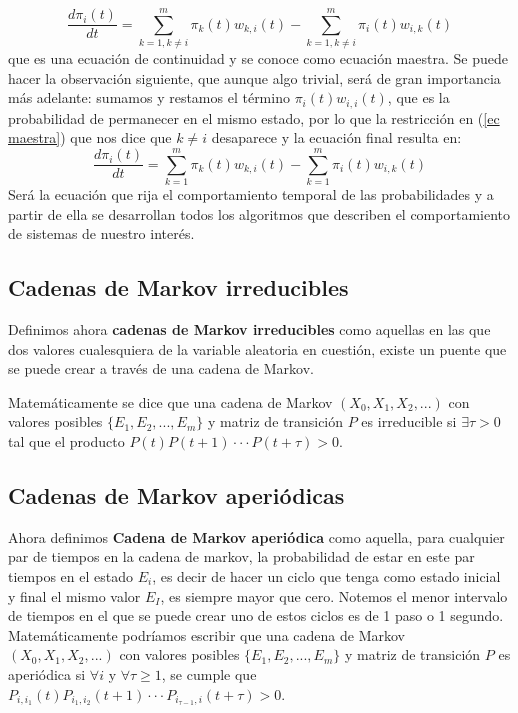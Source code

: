\documentclass[12pt]{book}
\begin{document}
\begin{equation}
\boxed{\frac{d\pi_{i}(t)}{dt} = \sum_{k=1, k\neq i}^{m} \pi_{k}(t)  w_{k,i}(t)-\sum_{k=1, k\neq i}^{m} \pi_{i}(t)  w_{i,k}(t)}	\label{ec maestra}
\end{equation}
que es una ecuación de continuidad y se conoce como ecuación maestra. Se puede hacer la observación siguiente, que aunque algo trivial, será de gran importancia más adelante: sumamos y restamos el término $\pi_{i}(t)  w_{i,i}(t)$, que es la probabilidad de permanecer en el mismo estado, por lo que la restricción en (\ref{ec maestra}) que nos dice que $k\neq i$ desaparece y la ecuación final resulta en:
\begin{equation}
\boxed{\frac{d\pi_{i}(t)}{dt} = \sum_{k=1}^{m} \pi_{k}(t)  w_{k,i}(t)-\sum_{k=1}^{m} \pi_{i}(t)  w_{i,k}(t)}	\label{ec maestra final}
\end{equation}
Será la ecuación que rija el comportamiento temporal de las probabilidades y a partir de ella se desarrollan todos los algoritmos que describen el comportamiento de sistemas de nuestro interés.
\subsection{Cadenas de Markov irreducibles}

Definimos ahora \textbf{cadenas de Markov irreducibles} como aquellas en las que dos valores cualesquiera de la variable aleatoria en cuestión, existe un puente que se puede crear a través de una cadena de Markov.

Matemáticamente se dice que una cadena de Markov $(X_{0},X_{1},X_{2},...)$ con valores posibles $\{E_{1},E_{2},...,E_{m}\}$ y matriz de transición $P$ es irreducible si $\exists \tau>0$ tal que el producto $P(t)P(t+1)\cdot \cdot \cdot P(t+\tau)>0$.

\subsection{Cadenas de Markov aperiódicas}

Ahora definimos \textbf{Cadena de Markov aperiódica} como aquella, para cualquier par de tiempos en la cadena de markov, la probabilidad de estar en este par tiempos en el estado $E_{i}$, es decir de hacer un ciclo que tenga como estado inicial y final el mismo valor $E_{I}$, es siempre mayor que cero. Notemos el menor intervalo de tiempos en el que se puede crear uno de estos ciclos es de 1 paso o 1 segundo.
Matemáticamente podríamos escribir que una cadena de Markov $(X_{0},X_{1},X_{2},...)$ con valores posibles $\{E_{1},E_{2},...,E_{m}\}$ y matriz de transición $P$ es aperiódica si $\forall i$ y $\forall \tau \geq 1$, se cumple que $P_{i,i_{1}}(t)P_{i_{1},i_{2}}(t+1)\cdot \cdot \cdot P_{i_{\tau-1},i}(t+\tau)>0$.
\\
\end{document}

